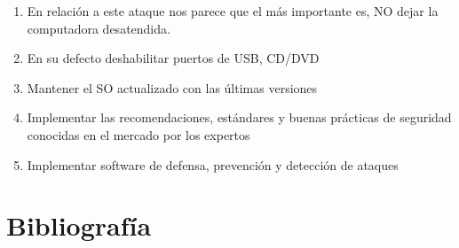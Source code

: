 \documentclass{article}
\begin{document}
\begin{enumerate}
    \item En relación a este ataque nos parece que el más importante es, NO dejar la computadora desatendida.
    
    \item En su defecto deshabilitar puertos de USB, CD/DVD
    
    \item Mantener el SO actualizado con las últimas versiones
    
    \item Implementar las recomendaciones, estándares y buenas prácticas de seguridad conocidas en el mercado por los expertos
    
    \item Implementar software de defensa, prevención y detección de ataques
    
\end{enumerate}

\section*{Bibliografía}
\end{document}
